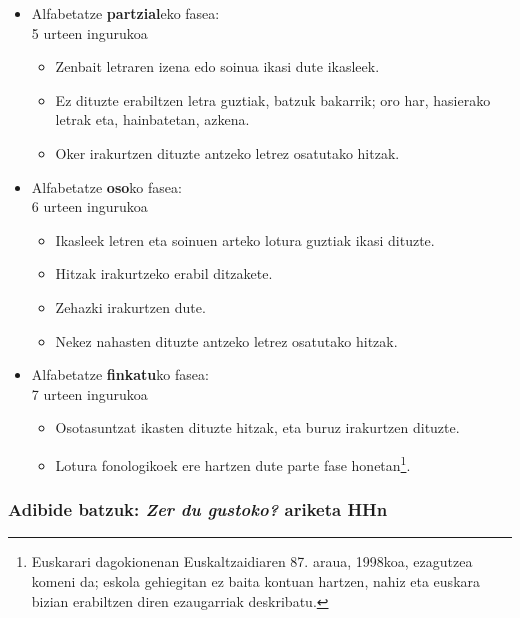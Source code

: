 \documentclass[]{book}
\providecommand{\tightlist}{%
  \setlength{\itemsep}{0pt}\setlength{\parskip}{0pt}}
\let\rmarkdownfootnote\footnote%
\def\footnote{\protect\rmarkdownfootnote}
\begin{document}
\begin{itemize}
\tightlist
\item
  Alfabetatze \textbf{partzial}eko fasea:\\
  5 urteen ingurukoa

  \begin{itemize}
  \tightlist
  \item
    Zenbait letraren izena edo soinua ikasi dute ikasleek.
  \item
    Ez dituzte erabiltzen letra guztiak, batzuk bakarrik; oro har, hasierako letrak eta, hainbatetan, azkena.
  \item
    Oker irakurtzen dituzte antzeko letrez osatutako hitzak.
  \end{itemize}
\item
  Alfabetatze \textbf{oso}ko fasea:\\
  6 urteen ingurukoa

  \begin{itemize}
  \tightlist
  \item
    Ikasleek letren eta soinuen arteko lotura guztiak ikasi dituzte.
  \item
    Hitzak irakurtzeko erabil ditzakete.
  \item
    Zehazki irakurtzen dute.
  \item
    Nekez nahasten dituzte antzeko letrez osatutako hitzak.
  \end{itemize}
\item
  Alfabetatze \textbf{finkatu}ko fasea:\\
  7 urteen ingurukoa

  \begin{itemize}
  \tightlist
  \item
    Osotasuntzat ikasten dituzte hitzak, eta buruz irakurtzen dituzte.
  \item
    Lotura fonologikoek ere hartzen dute parte fase honetan\footnote{Euskarari dagokionenan Euskaltzaidiaren 87. araua, 1998koa, ezagutzea komeni da; eskola gehiegitan ez baita kontuan hartzen, nahiz eta euskara bizian erabiltzen diren ezaugarriak deskribatu.}.
  \end{itemize}
\end{itemize}

\hypertarget{adibide-batzuk-zer-du-gustoko-ariketa-hhn}{%
\subsubsection{\texorpdfstring{Adibide batzuk: \emph{Zer du gustoko?} ariketa HHn}{Adibide batzuk: Zer du gustoko? ariketa HHn}}\label{adibide-batzuk-zer-du-gustoko-ariketa-hhn}}
\end{document}
